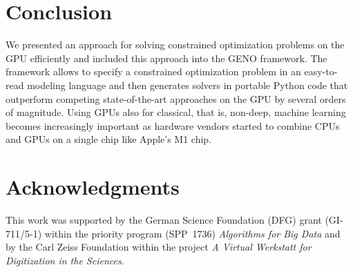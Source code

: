 \documentclass[letterpaper]{article} %
\begin{document}
\section{Conclusion}
We presented an approach for solving constrained optimization problems on the GPU efficiently and included this approach into the GENO framework.
The framework allows to specify a constrained optimization problem in an easy-to-read modeling language  and then generates solvers in portable Python code that outperform competing state-of-the-art approaches on the GPU by several orders of magnitude. Using GPUs also for classical, that is, non-deep, machine learning becomes increasingly important as hardware vendors %
started to combine CPUs and GPUs on a single chip like Apple's M1 chip.


\section*{Acknowledgments}
This work was supported by the German Science Foundation (DFG) grant (GI-711/5-1) within the priority program (SPP~1736) \emph{Algorithms for Big Data} and by the Carl Zeiss Foundation within the project \emph{A Virtual Werkstatt for Digitization in the Sciences}.
\end{document}
